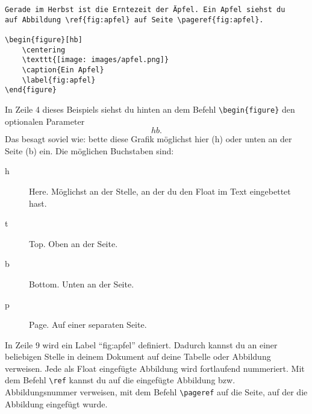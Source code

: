 \begin{lstlisting}
Gerade im Herbst ist die Erntezeit der Äpfel. Ein Apfel siehst du 
auf Abbildung \ref{fig:apfel} auf Seite \pageref{fig:apfel}.

\begin{figure}[hb]
	\centering
	\texttt{[image: images/apfel.png]}
	\caption{Ein Apfel}
	\label{fig:apfel}
\end{figure}
\end{lstlisting}

In Zeile 4 dieses Beispiels siehst du hinten an dem Befehl \texttt{\textbackslash begin\{figure\}} den optionalen Parameter \texttt{\[hb.\]} Das besagt soviel wie: bette diese Grafik möglichst hier (h) oder unten an der Seite (b) ein. Die möglichen Buchstaben sind:

\begin{description}
\item[h] Here. Möglichst an der Stelle, an der du den Float im Text eingebettet hast.
\item[t] Top. Oben an der Seite.
\item[b] Bottom. Unten an der Seite.
\item[p] Page. Auf einer separaten Seite.
\end{description}

In Zeile 9 wird ein Label \enquote{fig:apfel} definiert. Dadurch kannst du an einer beliebigen Stelle in deinem Dokument auf deine Tabelle oder Abbildung verweisen. Jede als Float eingefügte Abbildung wird fortlaufend nummeriert. Mit dem Befehl \texttt{\textbackslash ref} kannst du auf die eingefügte Abbildung bzw. Abbildungsnummer verweisen, mit dem Befehl \texttt{\textbackslash pageref} auf die Seite, auf der die Abbildung eingefügt wurde.








